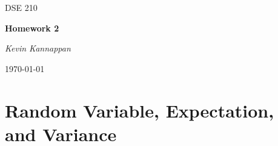 \documentclass[12pt]{article}
\theoremstyle{plain}
\theoremstyle{definition}
\numberwithin{equation}{theorem}
\begin{document}
\begin{titlepage}
	\centering
	\vspace{4cm}
	{\scshape\Large DSE 210\par}
	\vspace{1.5cm}
	{\huge\bfseries Homework 2\par}
	\vspace{2cm}
	{\Large\itshape Kevin Kannappan\par}

	{\large \today\par}
\end{titlepage}


\section{Random Variable, Expectation, and Variance}
\end{document}
